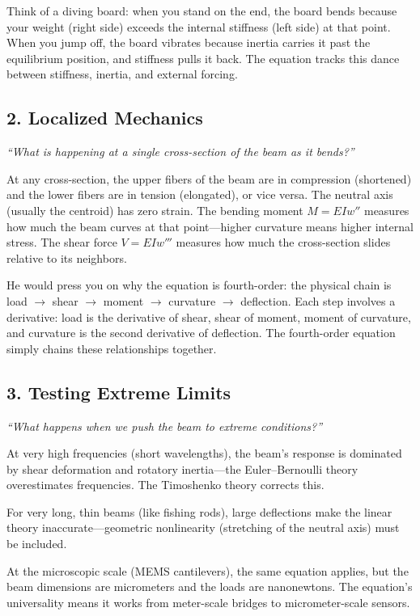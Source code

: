 \documentclass[11pt,openright]{book}
\begin{document}
Think of a diving board: when you stand on the end, the board bends because your weight (right side) exceeds the internal stiffness (left side) at that point. When you jump off, the board vibrates because inertia carries it past the equilibrium position, and stiffness pulls it back. The equation tracks this dance between stiffness, inertia, and external forcing.

\subsection*{2. Localized Mechanics}
\textit{``What is happening at a single cross-section of the beam as it bends?''}

At any cross-section, the upper fibers of the beam are in compression (shortened) and the lower fibers are in tension (elongated), or vice versa. The neutral axis (usually the centroid) has zero strain. The bending moment $M = EIw''$ measures how much the beam curves at that point---higher curvature means higher internal stress. The shear force $V = EIw'''$ measures how much the cross-section slides relative to its neighbors.

He would press you on why the equation is fourth-order: the physical chain is load $\to$ shear $\to$ moment $\to$ curvature $\to$ deflection. Each step involves a derivative: load is the derivative of shear, shear of moment, moment of curvature, and curvature is the second derivative of deflection. The fourth-order equation simply chains these relationships together.

\subsection*{3. Testing Extreme Limits}
\textit{``What happens when we push the beam to extreme conditions?''}

At very high frequencies (short wavelengths), the beam's response is dominated by shear deformation and rotatory inertia---the Euler--Bernoulli theory overestimates frequencies. The Timoshenko theory corrects this.

For very long, thin beams (like fishing rods), large deflections make the linear theory inaccurate---geometric nonlinearity (stretching of the neutral axis) must be included.

At the microscopic scale (MEMS cantilevers), the same equation applies, but the beam dimensions are micrometers and the loads are nanonewtons. The equation's universality means it works from meter-scale bridges to micrometer-scale sensors.
\end{document}
